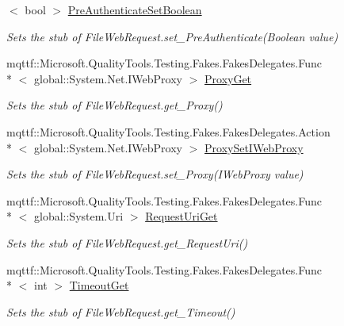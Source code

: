 \begin{DoxyCompactItemize}
$<$ bool $>$ \hyperlink{class_system_1_1_net_1_1_fakes_1_1_stub_file_web_request_a071bd05d3a5af8e6bac91668c14df07a}{Pre\-Authenticate\-Set\-Boolean}
\begin{DoxyCompactList}\small\item\em Sets the stub of File\-Web\-Request.\-set\-\_\-\-Pre\-Authenticate(\-Boolean value)\end{DoxyCompactList}\item 
mqttf\-::\-Microsoft.\-Quality\-Tools.\-Testing.\-Fakes.\-Fakes\-Delegates.\-Func\\*
$<$ global\-::\-System.\-Net.\-I\-Web\-Proxy $>$ \hyperlink{class_system_1_1_net_1_1_fakes_1_1_stub_file_web_request_ad9350264dccf2f759a26cad88d315c03}{Proxy\-Get}
\begin{DoxyCompactList}\small\item\em Sets the stub of File\-Web\-Request.\-get\-\_\-\-Proxy()\end{DoxyCompactList}\item 
mqttf\-::\-Microsoft.\-Quality\-Tools.\-Testing.\-Fakes.\-Fakes\-Delegates.\-Action\\*
$<$ global\-::\-System.\-Net.\-I\-Web\-Proxy $>$ \hyperlink{class_system_1_1_net_1_1_fakes_1_1_stub_file_web_request_a777650151b4cd307bf17d8867929b832}{Proxy\-Set\-I\-Web\-Proxy}
\begin{DoxyCompactList}\small\item\em Sets the stub of File\-Web\-Request.\-set\-\_\-\-Proxy(\-I\-Web\-Proxy value)\end{DoxyCompactList}\item 
mqttf\-::\-Microsoft.\-Quality\-Tools.\-Testing.\-Fakes.\-Fakes\-Delegates.\-Func\\*
$<$ global\-::\-System.\-Uri $>$ \hyperlink{class_system_1_1_net_1_1_fakes_1_1_stub_file_web_request_a09f32930ded46781905a6caeaa22918f}{Request\-Uri\-Get}
\begin{DoxyCompactList}\small\item\em Sets the stub of File\-Web\-Request.\-get\-\_\-\-Request\-Uri()\end{DoxyCompactList}\item 
mqttf\-::\-Microsoft.\-Quality\-Tools.\-Testing.\-Fakes.\-Fakes\-Delegates.\-Func\\*
$<$ int $>$ \hyperlink{class_system_1_1_net_1_1_fakes_1_1_stub_file_web_request_abff08b2091a4827bc1f266e2b228d9a1}{Timeout\-Get}
\begin{DoxyCompactList}\small\item\em Sets the stub of File\-Web\-Request.\-get\-\_\-\-Timeout()\end{DoxyCompactList}\item 

\end{DoxyCompactItemize}
